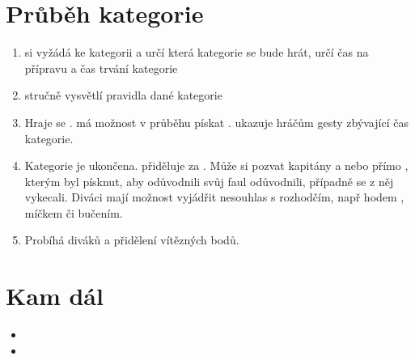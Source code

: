\documentclass[main.tex]{subfiles}
\begin{document}
\section{ Průběh kategorie } \begin{enumerate}
\item  {} si vyžádá  ke kategorii a určí která kategorie se bude hrát, určí čas na přípravu a čas trvání kategorie
\item  {} stručně vysvětlí pravidla dané kategorie
\item  Hraje se .  má možnost v průběhu pískat .  ukazuje hráčům gesty zbývající čas kategorie.
\item  Kategorie je ukončena.  přiděluje  za . Může si pozvat kapitány a nebo přímo , kterým byl  písknut, aby odůvodnili svůj faul odůvodnili, případně se z něj vykecali. Diváci mají možnost vyjádřit nesouhlas s rozhodčím, např hodem , míčkem či bučením.
\item  Probíhá  diváků a přidělení vítězných bodů.
\end{enumerate}
 
\section{ Kam dál } \begin{itemize}
\item  {}
\item  {}
\end{itemize}
 
 
 
 
\end{document}
